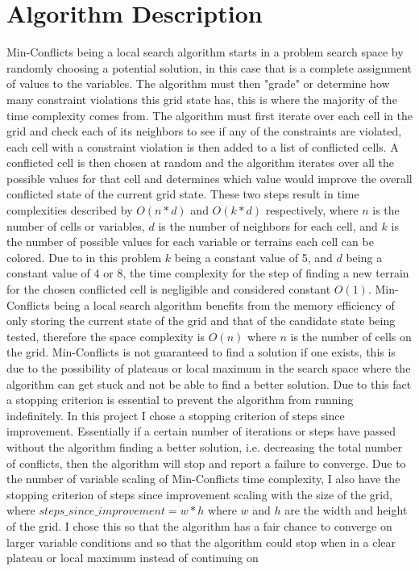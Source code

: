 \documentclass[conference]{IEEEtran}
\begin{document}
\section{Algorithm Description}
Min-Conflicts being a local search algorithm starts in a problem search space by randomly choosing a potential solution, in this case that is a complete assignment of values to the variables. The algorithm must then "grade" or determine how many constraint violations this grid state has, this is where the majority of the time complexity comes from. The algorithm must first iterate over each cell in the grid and check each of its neighbors to see if any of the constraints are violated, each cell with a constraint violation is then added to a list of conflicted cells. A conflicted cell is then chosen at random and the algorithm iterates over all the possible values for that cell and determines which value would improve the overall conflicted state of the current grid state. These two steps result in time complexities described by $O(n*d)$ and $O(k*d)$ respectively, where $n$ is the number of cells or variables, $d$ is the number of neighbors for each cell, and $k$ is the number of possible values for each variable or terrains each cell can be colored. Due to in this problem $k$ being a constant value of 5, and $d$ being a constant value of 4 or 8, the time complexity for the step of finding a new terrain for the chosen conflicted cell is negligible and considered constant $O(1)$. Min-Conflicts being a local search algorithm benefits from the memory efficiency of only storing the current state of the grid and that of the candidate state being tested, therefore the space complexity is $O(n)$ where $n$ is the number of cells on the grid. Min-Conflicts is not guaranteed to find a solution if one exists, this is due to the possibility of plateaus or local maximum in the search space where the algorithm can get stuck and not be able to find a better solution. Due to this fact a stopping criterion is essential to prevent the algorithm from running indefinitely. In this project I chose a stopping criterion of steps since improvement. Essentially if a certain number of iterations or steps have passed without the algorithm finding a better solution, i.e. decreasing the total number of conflicts, then the algorithm will stop and report a failure to converge. Due to the number of variable scaling of Min-Conflicts time complexity, I also have the stopping criterion of steps since improvement scaling with the size of the grid, where $steps\_since\_improvement = w * h$ where $w$ and $h$ are the width and height of the grid. I chose this so that the algorithm has a fair chance to converge on larger variable conditions and so that the algorithm could stop when in a clear plateau or local maximum instead of continuing on 
\end{document}
